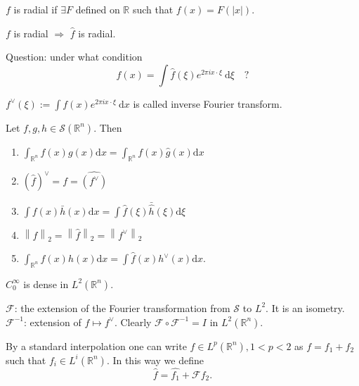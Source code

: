 \begin{definition}\label{def:radial}
$f$ is radial if $\exists F$ defined on $\mathbb{R}$ such that $f(x)=F(\lvert x \rvert)$.
\end{definition}

\begin{corollary}\label{cor:1.2}
$f$ is radial $\Rightarrow$ $\hat{f}$ is radial.
\end{corollary}

Question: under what condition
$$
f(x)=\int \hat{f}(\xi)e^{2\pi ix\cdot \xi}\ \mathrm{d}\xi \quad?
$$

\begin{definition}\label{def:inverse_fourier}
$f^{\vee}(\xi):=\int f(x)e^{2\pi ix\cdot \xi}\ \mathrm{d}x$ is called inverse Fourier transform.
\end{definition}

\begin{theorem}\label{thm:1.3}
Let $f,g,h \in \mathscr{S}(\mathbb{R}^{n})$. Then
\begin{enumerate}[label=(\roman*)]
    \item $\int _{\mathbb{R}^{n}}\hat{f}(x)g(x)\mathrm{d}x=\int _{\mathbb{R}^{n}}f(x)\hat{g}(x)\mathrm{d}x$
    \item $(\hat{f})^{\vee}=f=\widehat{(f^{\vee})}$
    \item $\int f(x)\bar{h}(x)\mathrm{d}x=\int \hat{f}(\xi)\bar{\hat{h}}(\xi)\mathrm{d}\xi$
    \item $\left\| f \right\|_{2}=\left\| \hat{f} \right\|_{2}=\left\| f^{\vee} \right\|_{2}$
    \item $\int _{\mathbb{R}^{n}}f(x)h(x)\mathrm{d}x=\int \hat{f}(x)h^{\vee}(x)\mathrm{d}x$.
\end{enumerate}
\end{theorem}

\begin{lemma}\label{lem:1.4}
$C_{0}^{\infty}$ is dense in $L^{2}(\mathbb{R}^{n})$.
\end{lemma}

$\mathscr{F}$: the extension of the Fourier transformation from $\mathscr{S}$ to $L^{2}$. It is an isometry.
$\mathscr{F}^{-1}$: extension of $f\mapsto f^{\vee}$.
Clearly $\mathscr{F}\circ \mathscr{F}^{-1}=I$ in $L^{2}(\mathbb{R}^{n})$.

By a standard interpolation one can write $f\in L^{p}(\mathbb{R}^{n}),1<p<2$ as $f=f_{1}+f_{2}$ such that $f_{i}\in L^{i}(\mathbb{R}^{n})$. In this way we define
$$
\hat{f}=\hat{f_{1}}+\mathscr{F}f_{2}.
$$

